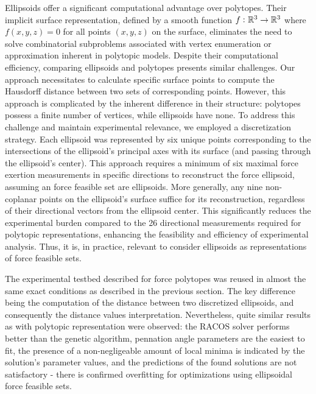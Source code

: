 
Ellipsoids offer a significant computational advantage over polytopes. Their implicit surface representation, defined by a smooth function $f\,\colon \mathbb{R}^3\to \mathbb{R}^3$ where $f(x,y,z)=0$ for all points $(x,y,z)$ on the surface, eliminates the need to solve combinatorial subproblems associated with vertex enumeration or approximation inherent in polytopic models. Despite their computational efficiency, comparing ellipsoids and polytopes presents similar challenges.  Our approach necessitates to calculate specific surface points to compute the Hausdorff distance between two sets of corresponding points. However, this approach is complicated by the inherent difference in their structure: polytopes possess a finite number of vertices, while ellipsoids have none. To address this challenge and maintain experimental relevance, we employed a discretization strategy. Each ellipsoid was represented by six unique points corresponding to the intersections of the ellipsoid's principal axes with its surface (and passing through the ellipsoid's center). This approach requires a minimum of six maximal force exertion measurements in specific directions to reconstruct the force ellipsoid, assuming an force feasible set are ellipsoids. More generally, any nine non-coplanar points on the ellipsoid's surface suffice for its reconstruction, regardless of their directional vectors from the ellipsoid center. This significantly reduces the experimental burden compared to the 26 directional measurements required for polytopic representations, enhancing the feasibility and efficiency of experimental analysis. Thus, it is, in practice, relevant to consider ellipsoids as representations of force feasible sets.

The experimental testbed described for force polytopes was reused in almost the same exact conditions as described in the previous section. The key difference being the computation of the distance between two discretized ellipsoids, and consequently the distance values interpretation. Nevertheless, quite similar results as with polytopic representation were observed: the RACOS solver performs better than the genetic algorithm, pennation angle parameters are the easiest to fit, the presence of a non-negligeable amount of local minima is indicated by the solution's parameter values, and the predictions of the found solutions are not satisfactory - there is confirmed overfitting for optimizations using ellipsoidal force feasible sets. 

